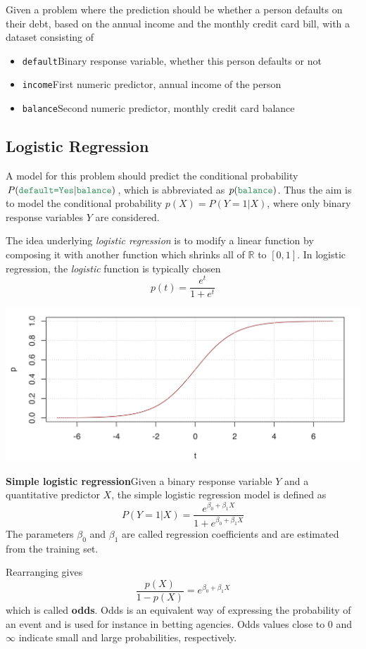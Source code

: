 \documentclass[11pt]{article}
\newcommand*\R{\mathbb{R}}
\newcommand*\predvar[1]{{\color{SeaGreen4} \texttt{#1}}}
\begin{document}
Given a problem where the prediction should be whether a person defaults on their debt, based on the annual income and the monthly credit card bill, with a dataset consisting of
\begin{itemize}
	\item \predvar{default}\qquad Binary response variable, whether this person defaults or not
	\item \predvar{income}\qquad First numeric predictor, annual income of the person
	\item \predvar{balance}\qquad Second numeric predictor, monthly credit card balance
\end{itemize}

\subsection{Logistic Regression}
A model for this problem should predict the conditional probability $P(\predvar{default=Yes}|\predvar{balance})$, which is abbreviated as $p(\predvar{balance})$. Thus the aim is to model the conditional probability $p(X) = P(Y=1|X)$, where only binary response variables $Y$ are considered.

The idea underlying \emph{logistic regression} is to modify a linear function by composing it with another function which shrinks all of $\R$ to $[0,1]$. In logistic regression, the \emph{logistic} function is typically chosen
\begin{equation*}
	p(t) = \frac{e^t}{1+e^t}
\end{equation*}
\begin{center}
	\includegraphics[width=0.4\linewidth]{img/logistic_function}
\end{center}


\begin{definition}
	\textbf{Simple logistic regression}\qquad Given a binary response variable $Y$ and a quantitative predictor $X$, the simple logistic regression model is defined as
	\begin{equation*}
		P(Y=1|X) = \frac{e^{\beta_0+\beta_1 X}}{1+e^{\beta_0+\beta_1 X}}
	\end{equation*}
	The parameters $\beta_0$ and $\beta_1$ are called regression coefficients and are estimated from the training set.
\end{definition}
Rearranging gives
\begin{equation*}
	\frac{p(X)}{1-p(X)} = e^{\beta_0+\beta_1X}
\end{equation*}
which is called \textbf{odds}. Odds is an equivalent way of expressing the probability of an event and is used for instance in betting agencies. Odds values close to 0 and $\infty$ indicate small and large probabilities, respectively.
\end{document}
